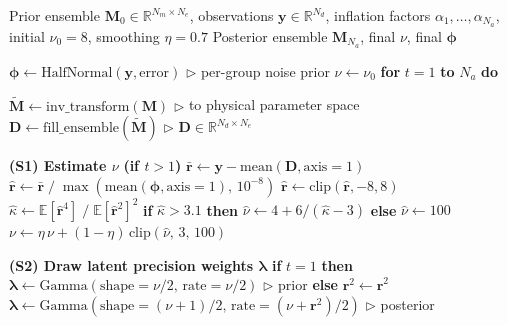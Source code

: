 \documentclass[article,nojss]{jss}
\begin{document}
\begin{algorithm}[tbp]
\caption{ES-MDA with Adaptive Student-$t$ Likelihood}
\label{alg:esmda_student_t}
\begin{algorithmic}[1]
\REQUIRE Prior ensemble $\mathbf{M}_0 \in \mathbb{R}^{N_m \times N_e}$,
         observations $\mathbf{y} \in \mathbb{R}^{N_d}$,
         inflation factors $\alpha_1, \ldots, \alpha_{N_a}$,
         initial $\nu_0 = 8$, smoothing $\eta = 0.7$
\ENSURE Posterior ensemble $\mathbf{M}_{N_a}$, final $\nu$, final $\boldsymbol{\phi}$

\STATE $\boldsymbol{\phi} \gets \text{HalfNormal}(\mathbf{y}, \text{error})$
       \hfill $\triangleright$ per-group noise prior
\STATE $\nu \gets \nu_0$
\STATE \textbf{for} $t = 1$ \textbf{to} $N_a$ \textbf{do}

\STATE \quad $\tilde{\mathbf{M}} \gets \text{inv\_transform}(\mathbf{M})$
       \hfill $\triangleright$ to physical parameter space
\STATE \quad $\mathbf{D} \gets \text{fill\_ensemble}(\tilde{\mathbf{M}})$
       \hfill $\triangleright$ $\mathbf{D} \in \mathbb{R}^{N_d \times N_e}$

\STATE \quad \textbf{(S1) Estimate $\nu$} \textbf{(if $t > 1$)}
\STATE \quad\quad $\bar{\mathbf{r}} \gets \mathbf{y} - \text{mean}(\mathbf{D}, \text{axis}=1)$
\STATE \quad\quad $\hat{\mathbf{r}} \gets \bar{\mathbf{r}} \;/\; \max(\text{mean}(\boldsymbol{\phi}, \text{axis}=1),\, 10^{-8})$
\STATE \quad\quad $\hat{\mathbf{r}} \gets \text{clip}(\hat{\mathbf{r}}, -8, 8)$
\STATE \quad\quad $\hat{\kappa} \gets \mathbb{E}[\hat{\mathbf{r}}^4] \;/\; \mathbb{E}[\hat{\mathbf{r}}^2]^2$
\STATE \quad\quad \textbf{if} $\hat{\kappa} > 3.1$ \textbf{then}
                    $\hat{\nu} \gets 4 + 6/(\hat{\kappa} - 3)$
                    \textbf{else} $\hat{\nu} \gets 100$
\STATE \quad\quad $\nu \gets \eta\,\nu + (1-\eta)\,\text{clip}(\hat{\nu},\, 3,\, 100)$

\STATE \quad \textbf{(S2) Draw latent precision weights $\boldsymbol{\lambda}$}
\STATE \quad\quad \textbf{if} $t = 1$ \textbf{then}
\STATE \quad\quad\quad $\boldsymbol{\lambda} \gets \text{Gamma}(\text{shape}=\nu/2,\,
                         \text{rate}=\nu/2)$
                         \hfill $\triangleright$ prior
\STATE \quad\quad \textbf{else}
\STATE \quad\quad\quad $\mathbf{r}^2 \gets \hat{\mathbf{r}}^2$
\STATE \quad\quad\quad $\boldsymbol{\lambda} \gets \text{Gamma}(\text{shape}=(\nu+1)/2,\,
                         \text{rate}=(\nu+\mathbf{r}^2)/2)$
                         \hfill $\triangleright$ posterior


\end{algorithmic}
\end{algorithm}
\end{document}
